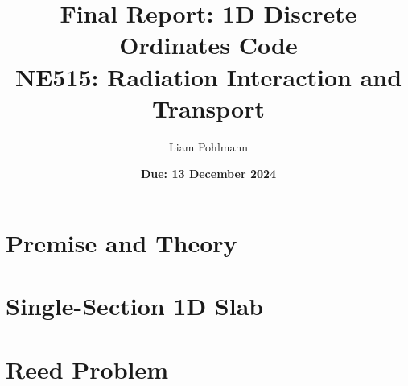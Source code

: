 \documentclass{math_hw}
\title{\textbf{Final Report: 1D Discrete Ordinates Code}\\ \vspace{1em}
NE515: Radiation Interaction and Transport}
\author[1]{Liam Pohlmann}
\affil[1]{University of New Mexico, Department of Nuclear Engineering}
\date{\textbf{Due: 13 December 2024}}
\theoremstyle{definition}
\begin{document}
    \maketitle
    \tableofcontents
    \clearpage


    \section{Premise and Theory}
    \section{Single-Section 1D Slab}
    
    \section{Reed Problem}
\end{document}
